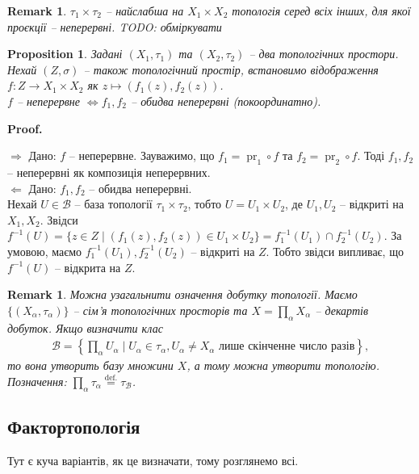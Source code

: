 \documentclass[a4paper, 10pt]{article}
\makeatletter
\def\rightproof{$\boxed{\Rightarrow}$ }
\def\leftproof{$\boxed{\Leftarrow}$ }
\theoremstyle{theoremdd}
\newtheorem{proposition}[theorem]{Proposition}
\newtheorem{remark}[theorem]{Remark}
\DeclareMathOperator{\pr}{pr}
\renewenvironment{proof}[1][Proof.\\]{\par
\pushQED{\hfill \qed}%
\normalfont \topsep6\p@\@plus6\p@\relax
\trivlist
\item\relax
{\bfseries
#1\@addpunct{.}}\hspace\labelsep\ignorespaces
}{%
\popQED\endtrivlist\@endpefalse
}
\makeatother
\begin{document}
\begin{remark}
$\tau_1 \times \tau_2$ -- найслабша на $X_1 \times X_2$ топологія серед всіх інших, для якої проєкції -- неперервні. \textit{TODO: обміркувати}
\end{remark}

\begin{proposition}
Задані $(X_1,\tau_1)$ та $(X_2,\tau_2)$ -- два топологічних простори. Нехай $(Z,\sigma)$ -- також топологічний простір, встановимо відображення $f \colon Z \to X_1 \times X_2$ як $z \mapsto (f_1(z),f_2(z))$.\\
$f$ -- неперервне $\iff f_1,f_2$ -- обидва неперервні (покоординатно).
\end{proposition}

\begin{proof}
\rightproof Дано: $f$ -- неперервне. Зауважимо, що $f_1 = \pr_1 \circ f$ та $f_2 = \pr_2 \circ f$. Тоді $f_1,f_2$ -- неперервні як композиція неперервних.
\bigskip \\
\leftproof Дано: $f_1,f_2$ -- обидва неперервні.\\
Нехай $U \in \mathcal{B}$ -- база топології $\tau_1 \times \tau_2$, тобто $U = U_1 \times U_2$, де $U_1,U_2$ -- відкриті на $X_1,X_2$. Звідси $f^{-1}(U) = \{ z \in Z \mid (f_1(z),f_2(z)) \in U_1 \times U_2\} = f_1^{-1}(U_1) \cap f_2^{-1}(U_2)$. За умовою, маємо $f_1^{-1}(U_1), f_2^{-1}(U_2)$ -- відкриті на $Z$. Тобто звідси випливає, що $f^{-1}(U)$ -- відкрита на $Z$.
\end{proof}

\begin{remark}
Можна узагальнити означення добутку топології. Маємо $\{(X_\alpha,\tau_\alpha)\}$ -- сім'я топологічних просторів та $X = \displaystyle\prod_{\alpha} X_\alpha$ -- декартів добуток. Якщо визначити клас
\begin{align*}
\mathcal{B} = \left\{ \prod_{\alpha} U_\alpha \mid U_\alpha \in \tau_\alpha, U_\alpha \neq X_\alpha \text{ лише скінченне число разів} \right\},
\end{align*}
то вона утворить базу множини $X$, а тому можна утворити топологію.\\
Позначення: $\displaystyle\prod_\alpha \tau_\alpha \overset{\text{def.}}{=} \tau_{\mathcal{B}}$.
\end{remark}

\subsection{Фактортопологія}
\noindent
Тут є куча варіантів, як це визначати, тому розглянемо всі.
\end{document}
